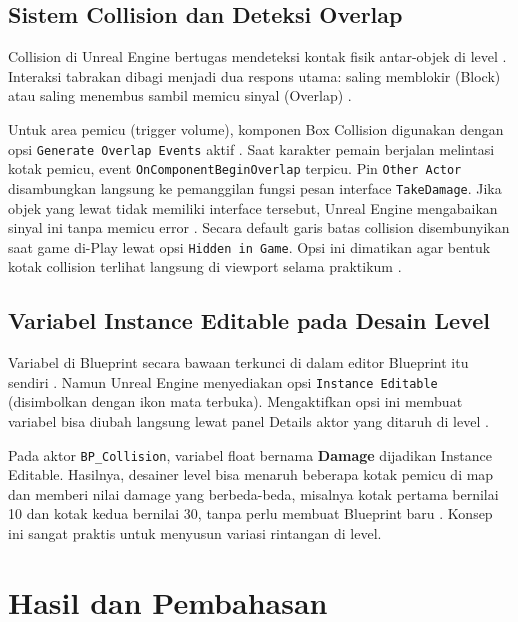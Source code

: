 \documentclass[a4paper,oneside,12pt]{report}
\newcommand{\tocboldsection}[1]{%
  \protect\renewcommand{\protect\cftchapfont}{\protect\bfseries}%
  #1%
  \protect\renewcommand{\protect\cftchapfont}{}%
}
\begin{document}
\section{Sistem Collision dan Deteksi Overlap}
Collision di Unreal Engine bertugas mendeteksi kontak fisik antar-objek di level \cite{epic-collision}. Interaksi tabrakan dibagi menjadi dua respons utama: saling memblokir (Block) atau saling menembus sambil memicu sinyal (Overlap) \cite{epic-collision-responses}.

Untuk area pemicu (trigger volume), komponen Box Collision digunakan dengan opsi \texttt{Generate Overlap Events} aktif \cite{modul4}. Saat karakter pemain berjalan melintasi kotak pemicu, event \texttt{OnComponentBeginOverlap} terpicu. Pin \texttt{Other Actor} disambungkan langsung ke pemanggilan fungsi pesan interface \texttt{TakeDamage}. Jika objek yang lewat tidak memiliki interface tersebut, Unreal Engine mengabaikan sinyal ini tanpa memicu error \cite{epic-interface}. Secara default garis batas collision disembunyikan saat game di-Play lewat opsi \texttt{Hidden in Game}. Opsi ini dimatikan agar bentuk kotak collision terlihat langsung di viewport selama praktikum \cite{modul4}.

\section{Variabel Instance Editable pada Desain Level}
Variabel di Blueprint secara bawaan terkunci di dalam editor Blueprint itu sendiri \cite{epic-variables}. Namun Unreal Engine menyediakan opsi \texttt{Instance Editable} (disimbolkan dengan ikon mata terbuka). Mengaktifkan opsi ini membuat variabel bisa diubah langsung lewat panel Details aktor yang ditaruh di level \cite{modul4,epic-variables}.

Pada aktor \texttt{BP\_Collision}, variabel float bernama \textbf{Damage} dijadikan Instance Editable. Hasilnya, desainer level bisa menaruh beberapa kotak pemicu di map dan memberi nilai damage yang berbeda-beda, misalnya kotak pertama bernilai 10 dan kotak kedua bernilai 30, tanpa perlu membuat Blueprint baru \cite{modul4}. Konsep ini sangat praktis untuk menyusun variasi rintangan di level.

\clearpage

\chapter[\tocboldsection{Hasil dan Pembahasan}]{Hasil dan Pembahasan}
\end{document}
